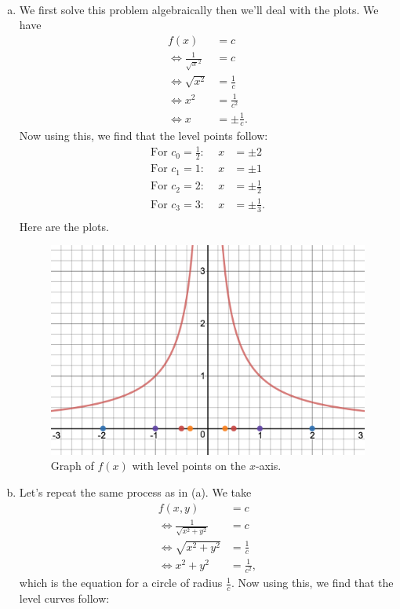 \documentclass[12pt]{article} %
\begin{document}
\begin{solution}~
\begin{enumerate}[(a)]
    \item We first solve this problem algebraically then we'll deal with the plots.  We have
    \begin{align*}
        f(x)&=c\\
        \iff \frac{1}{\sqrt{x}^2} &= c\\
        \iff \sqrt{x^2}&=\frac{1}{c}\\
        \iff x^2&= \frac{1}{c^2}\\
        \iff x &= \pm \frac{1}{c}.
    \end{align*}
    Now using this, we find that the level points follow:
    \begin{align*}
        \textrm{For $c_0=\frac{1}{2}$:~}\quad x&=\pm 2\\
        \textrm{For $c_1=1$:~}\quad x&=\pm 1\\
        \textrm{For $c_2=2$:~}\quad x&=\pm \frac{1}{2}\\
        \textrm{For $c_3=3$:~}\quad x&=\pm \frac{1}{3}.\\
    \end{align*}
    Here are the plots.
    \begin{figure}[H]
        \centering
        \includegraphics[width=.6\textwidth]{Images/level_points.png}
        \caption{Graph of $f(x)$ with level points on the $x$-axis.}
    \end{figure}
    \item Let's repeat the same process as in (a). We take
    \begin{align*}
        f(x,y)&=c\\
        \iff \frac{1}{\sqrt{x^2+y^2}}&= c\\
        \iff \sqrt{x^2+y^2}&=\frac{1}{c}\\
        \iff x^2+y^2 &= \frac{1}{c^2},
    \end{align*}
    which is the equation for a circle of radius $\frac{1}{c}$. Now using this, we find that the level curves follow:

\end{enumerate}
\end{solution}
\end{document}

